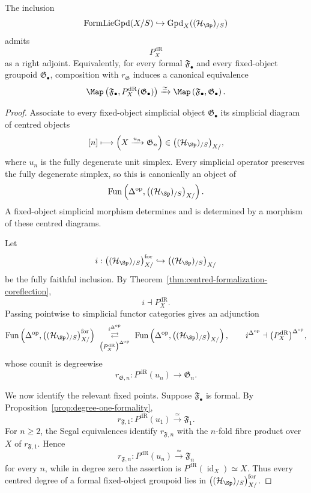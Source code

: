 \begin{theorem}
\label{thm:formalization-coreflection}
The inclusion
\[
    \operatorname{FormLieGpd}(X/S)
    \hookrightarrow
    \operatorname{Gpd}_X((\mathcal H_{\Sp})_{/S})
\]
admits
\[
    P_X^{\mathrm{dR}}
\]
as a right adjoint.  Equivalently, for every formal
$\mathfrak F_\bullet$ and every fixed-object groupoid
$\mathfrak G_\bullet$, composition with $r_{\mathfrak G}$ induces a
canonical equivalence
\[
    \Map
    \left(
        \mathfrak F_\bullet,
        P_X^{\mathrm{dR}}(\mathfrak G_\bullet)
    \right)
    \xrightarrow{\simeq}
    \Map
    \left(
        \mathfrak F_\bullet,
        \mathfrak G_\bullet
    \right).
\]
\end{theorem}

\begin{proof}
Associate to every fixed-object simplicial object
$\mathfrak G_\bullet$ its simplicial diagram of centred objects
\[
    [n]
    \longmapsto
    \left(
        X\xrightarrow{u_n}\mathfrak G_n
    \right)
    \in
    \bigl((\mathcal H_{\Sp})_{/S}\bigr)_{X/},
\]
where $u_n$ is the fully degenerate unit simplex.  Every simplicial operator
preserves the fully degenerate simplex, so this is canonically an object of
\[
    \operatorname{Fun}
    \left(
        \Delta^{\mathrm{op}},
        \bigl((\mathcal H_{\Sp})_{/S}\bigr)_{X/}
    \right).
\]
A fixed-object simplicial morphism determines and is determined by a
morphism of these centred diagrams.

Let
\[
    i:
    \bigl((\mathcal H_{\Sp})_{/S}\bigr)_{X/}^{\mathrm{for}}
    \hookrightarrow
    \bigl((\mathcal H_{\Sp})_{/S}\bigr)_{X/}
\]
be the fully faithful inclusion.  By
Theorem~\ref{thm:centred-formalization-coreflection},
\[
    i\dashv P_X^{\mathrm{dR}}.
\]
Passing pointwise to simplicial functor categories gives an adjunction
\[
    \operatorname{Fun}
    \left(
        \Delta^{\mathrm{op}},
        \bigl((\mathcal H_{\Sp})_{/S}\bigr)_{X/}^{\mathrm{for}}
    \right)
    \;\underset{\bigl(P_X^{\mathrm{dR}}\bigr)^{\Delta^{\mathrm{op}}}}{\overset{i^{\Delta^{\mathrm{op}}}}{\rightleftarrows}}\;
    \operatorname{Fun}
    \left(
        \Delta^{\mathrm{op}},
        \bigl((\mathcal H_{\Sp})_{/S}\bigr)_{X/}
    \right),
    \qquad
    i^{\Delta^{\mathrm{op}}}\dashv
    \bigl(P_X^{\mathrm{dR}}\bigr)^{\Delta^{\mathrm{op}}},
\]
whose counit is degreewise
\[
    r_{\mathfrak G,n}:
    P^{\mathrm{dR}}(u_n)
    \longrightarrow
    \mathfrak G_n.
\]

We now identify the relevant fixed points.  Suppose
$\mathfrak F_\bullet$ is formal.  By
Proposition~\ref{prop:degree-one-formality},
\[
    r_{\mathfrak F,1}:
    P^{\mathrm{dR}}(u_1)
    \xrightarrow{\simeq}
    \mathfrak F_1.
\]
For $n\ge2$, the Segal equivalences identify
$r_{\mathfrak F,n}$ with the $n$-fold fibre product over $X$ of
$r_{\mathfrak F,1}$.  Hence
\[
    r_{\mathfrak F,n}
    :
    P^{\mathrm{dR}}(u_n)
    \xrightarrow{\simeq}
    \mathfrak F_n
\]
for every $n$, while in degree zero the assertion is
$P^{\mathrm{dR}}(\operatorname{id}_X)\simeq X$.  Thus every centred degree of a
formal fixed-object groupoid lies in
$\bigl((\mathcal H_{\Sp})_{/S}\bigr)_{X/}^{\mathrm{for}}$.


\end{proof}
